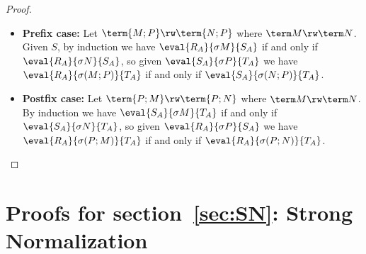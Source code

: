 \documentclass[a4paper,UKenglish,cleveref, autoref, thm-restate]{lipics-v2021}
\newcommand\case[1]{\textbf{#1}}
\begin{document}
\begin{proof}
\begin{itemize}
\item\case{Prefix case:} Let $\term{M;P}\rw\term{N;P}$ where $\term M\rw\term N$. Given $S$, by induction we have $\eval{R_A}{\sigma M}{S_A}$ if and only if $\eval{R_A}{\sigma N}{S_A}$, so given $\eval{S_A}{\sigma P}{T_A}$ we have $\eval{R_A}{\sigma(M;P)}{T_A}$ if and only if $\eval{S_A}{\sigma(N;P)}{T_A}$.

\item\case{Postfix case:} Let $\term{P;M}\rw\term{P;N}$ where $\term M\rw\term N$. By induction we have $\eval{S_A}{\sigma M}{T_A}$ if and only if $\eval{S_A}{\sigma N}{T_A}$, so given $\eval{R_A}{\sigma P}{S_A}$ we have $\eval{R_A}{\sigma(P;M)}{T_A}$ if and only if $\eval{R_A}{\sigma(P;N)}{T_A}$. 
%
\qedhere
\end{itemize}
\end{proof}



\section{Proofs for section~\ref{sec:SN}: Strong Normalization}


\substitutionStrong*
\end{document}
